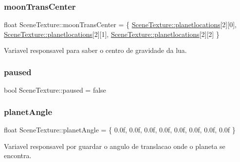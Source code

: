 \subsubsection{\texorpdfstring{moonTransCenter}{moonTransCenter}}
{\footnotesize\ttfamily float Scene\+Texture\+::moon\+Trans\+Center = \{ \mbox{\hyperlink{class_scene_texture_a1492e81fe8f97df9c6798e46ab09cb28}{Scene\+Texture\+::planetlocations}}\mbox{[}2\mbox{]}\mbox{[}0\mbox{]}, \mbox{\hyperlink{class_scene_texture_a1492e81fe8f97df9c6798e46ab09cb28}{Scene\+Texture\+::planetlocations}}\mbox{[}2\mbox{]}\mbox{[}1\mbox{]}, \mbox{\hyperlink{class_scene_texture_a1492e81fe8f97df9c6798e46ab09cb28}{Scene\+Texture\+::planetlocations}}\mbox{[}2\mbox{]}\mbox{[}2\mbox{]} \}\hspace{0.3cm}{\ttfamily [static]}}



Variavel responsavel para saber o centro de gravidade da lua. 

\mbox{\label{class_scene_texture_a7a09bbdb36a7e736717f99c30aa76220}} 
\subsubsection{\texorpdfstring{paused}{paused}}
{\footnotesize\ttfamily bool Scene\+Texture\+::paused = false\hspace{0.3cm}{\ttfamily [static]}}

\mbox{\label{class_scene_texture_ae804a3bbd5b89796760b7d6723b42558}} 
\subsubsection{\texorpdfstring{planetAngle}{planetAngle}}
{\footnotesize\ttfamily float Scene\+Texture\+::planet\+Angle = \{ 0.\+0f, 0.\+0f, 0.\+0f, 0.\+0f, 0.\+0f, 0.\+0f, 0.\+0f, 0.\+0f \}\hspace{0.3cm}{\ttfamily [static]}}



Variavel responsavel por guardar o angulo de translacao onde o planeta se encontra. 

\mbox{\label{class_scene_texture_acd7eab546d7fb95612c4708122a4871c}} 
